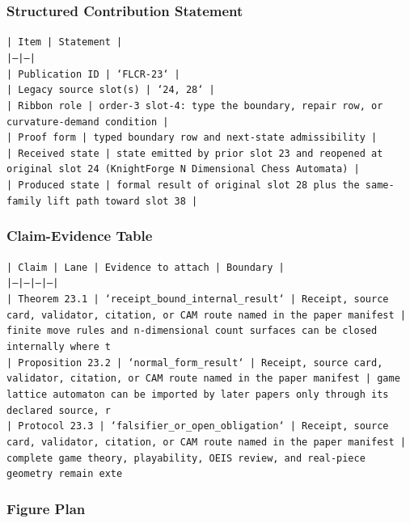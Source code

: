 \documentclass[11pt]{article}
\begin{document}
\subsubsection*{Structured Contribution Statement}

\noindent\texttt{| Item | Statement |}\\
\noindent\texttt{|---|---|}\\
\noindent\texttt{| Publication ID | `FLCR-23` |}\\
\noindent\texttt{| Legacy source slot(s) | `24, 28` |}\\
\noindent\texttt{| Ribbon role | order-3 slot-4: type the boundary, repair row, or curvature-demand condition |}\\
\noindent\texttt{| Proof form | typed boundary row and next-state admissibility |}\\
\noindent\texttt{| Received state | state emitted by prior slot 23 and reopened at original slot 24 (KnightForge N Dimensional Chess Automata) |}\\
\noindent\texttt{| Produced state | formal result of original slot 28 plus the same-family lift path toward slot 38 |}\\

\subsubsection*{Claim-Evidence Table}

\noindent\texttt{| Claim | Lane | Evidence to attach | Boundary |}\\
\noindent\texttt{|---|---|---|---|}\\
\noindent\texttt{| Theorem 23.1 | `receipt\_bound\_internal\_result` | Receipt, source card, validator, citation, or CAM route named in the paper manifest | finite move rules and n-dimensional count surfaces can be closed internally where t}\\
\noindent\texttt{| Proposition 23.2 | `normal\_form\_result` | Receipt, source card, validator, citation, or CAM route named in the paper manifest | game lattice automaton can be imported by later papers only through its declared source, r}\\
\noindent\texttt{| Protocol 23.3 | `falsifier\_or\_open\_obligation` | Receipt, source card, validator, citation, or CAM route named in the paper manifest | complete game theory, playability, OEIS review, and real-piece geometry remain exte}\\

\subsubsection*{Figure Plan}
\end{document}
